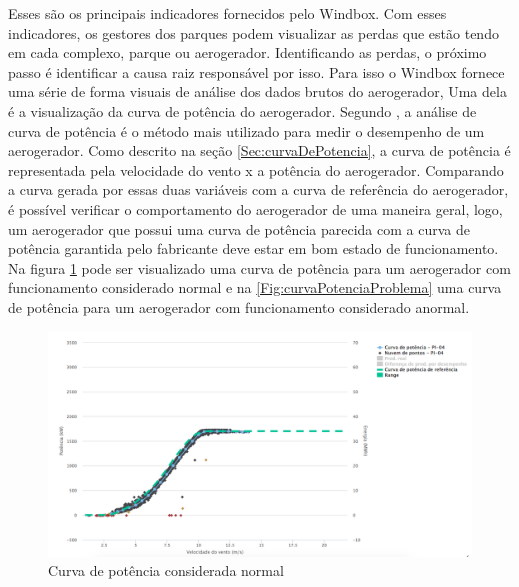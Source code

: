 Esses são os principais indicadores fornecidos pelo Windbox. Com esses indicadores, os gestores dos parques podem visualizar as perdas que estão tendo em cada complexo, parque ou aerogerador. Identificando as perdas, o próximo passo é identificar a causa raiz responsável por isso. Para isso o Windbox fornece uma série de forma visuais de análise dos dados brutos do aerogerador, Uma dela é a visualização da curva de potência do aerogerador. Segundo , a análise de curva de potência é o método mais utilizado para medir o desempenho de um aerogerador. Como descrito na seção \ref{Sec:curvaDePotencia}, a curva de potência é representada pela velocidade do vento x a potência do aerogerador. Comparando a curva gerada por essas duas variáveis com a curva de referência do aerogerador, é possível verificar o comportamento do aerogerador de uma maneira geral, logo, um aerogerador que possui uma curva de potência parecida com a curva de potência garantida pelo fabricante deve estar em bom estado de funcionamento. Na figura \ref{Fig:curvaPotenciaNormal} pode ser visualizado uma curva de potência para um aerogerador com funcionamento considerado normal e na \ref{Fig:curvaPotenciaProblema} uma curva de potência para um aerogerador com funcionamento considerado anormal.

\begin{figure}[htbp!] \begin{center}
\includegraphics[width=1\linewidth]{./figuras/curva-potencia-normal}
\caption{Curva de potência considerada normal}
\label{Fig:curvaPotenciaNormal}
\end{center} 
\end{figure}

